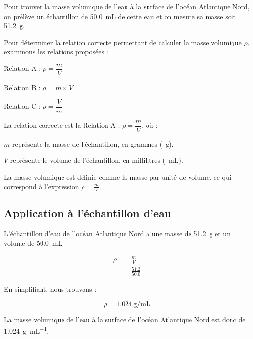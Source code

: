 \documentclass[answers]{exam}
\begin{document}
\begin{questions}
  Pour trouver la masse volumique de l’eau à la surface de l’océan Atlantique Nord, on prélève un échantillon de \SI{50.0}{\milli\liter} de cette eau et on mesure sa masse soit \SI{51.2}{\gram}.
  
  

\begin{solution}
Pour déterminer la relation correcte permettant de calculer la masse volumique $\rho$, examinons les relations proposées :

\begin{compactitem}
    \item Relation A : $\rho = \dfrac{m}{V}$
    \item Relation B : $\rho = m \times V$
    \item Relation C : $\rho = \dfrac{V}{m}$
\end{compactitem}

La relation correcte est la Relation A : $\rho = \dfrac{m}{V}$, où :

\begin{compactitem}
    \item $m$ représente la masse de l'échantillon, en grammes (\SI{}{\gram}).
    \item $V$ représente le volume de l'échantillon, en millilitres (\SI{}{\milli\liter}).
\end{compactitem}

La masse volumique est définie comme la masse par unité de volume, ce qui correspond à l'expression $\rho = \frac{m}{V}$.

\subsection*{Application à l'échantillon d'eau}

L'échantillon d'eau de l'océan Atlantique Nord a une masse de \SI{51.2}{\gram} et un volume de \SI{50.0}{\milli\liter}. 

\begin{align*}
    \rho &= \frac{m}{V} \\
    &= \frac{51.2}{50.0}
\end{align*}

En simplifiant, nous trouvons :

\[
\rho = \SI{1.024}{\gram\per\milli\liter}
\]

La masse volumique de l'eau à la surface de l'océan Atlantique Nord est donc de \SI{1.024}{\gram\per\milli\liter}.
\end{solution}


\end{questions}
\end{document}
